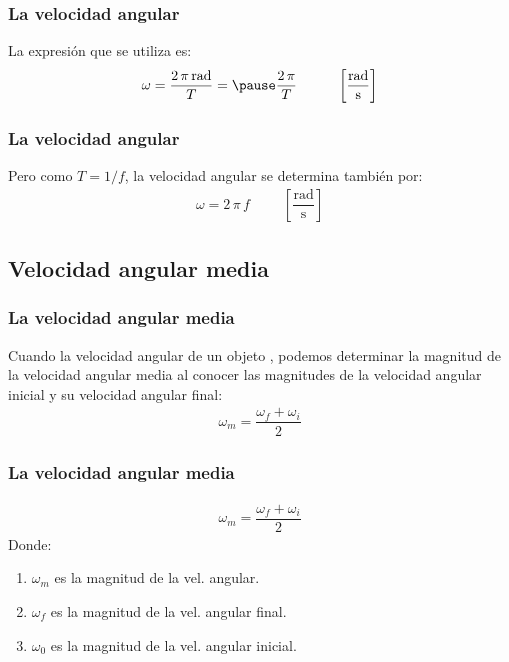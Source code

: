\documentclass[14pt]{beamer}
\begin{document}
\begin{frame}
\frametitle{La velocidad angular}
La expresión que se utiliza es:
\pause
\begin{eqnarray*}
\begin{aligned}
\omega = \dfrac{2 \, \pi \, \text{rad}}{T} = \pause \dfrac{2 \, \pi}{T} \hspace{1cm} \left[ \dfrac{\text{rad}}{\unit{\second}} \right]
\end{aligned}
\end{eqnarray*}
\end{frame}
\begin{frame}
\frametitle{La velocidad angular}
Pero como $T = 1 / f$, la velocidad angular se determina también por:
\pause
\begin{align*}
\omega = 2 \, \pi \, f \hspace{1cm} \left[ \dfrac{\text{rad}}{\unit{\second}} \right]
\end{align*}
\end{frame}

\subsection{Velocidad angular media}

\begin{frame}
\frametitle{La velocidad angular media}
Cuando la velocidad angular de un objeto , \pause podemos determinar la magnitud de la velocidad angular media al conocer las magnitudes de la velocidad angular inicial y su velocidad angular final:
\pause
\begin{align*}
\omega_{m} = \dfrac{\omega_{f} + \omega_{i}}{2}
\end{align*}
\end{frame}
\begin{frame}
\frametitle{La velocidad angular media}
\vspace*{-1cm}
\begin{align*}
\omega_{m} = \dfrac{\omega_{f} + \omega_{i}}{2}
\end{align*}
Donde:
\begin{enumerate}[<+->]
\item $\omega_{m}$ es la magnitud de la vel. angular.
\item $\omega_{f}$ es la magnitud de la vel. angular final.
\item $\omega_{0}$ es la magnitud de la vel. angular inicial.
\end{enumerate}
\end{frame}
\end{document}

